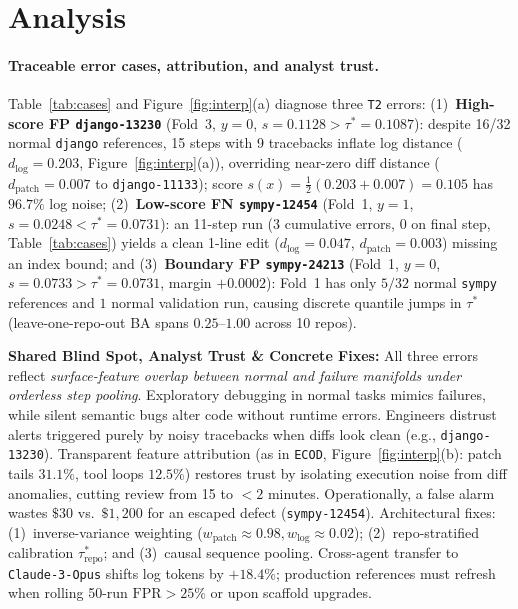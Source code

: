 \section{Analysis}\label{sec:analysis}
\paragraph{Traceable error cases, attribution, and analyst trust.}
Table~\ref{tab:cases} and Figure~\ref{fig:interp}(a) diagnose three \texttt{T2} errors: (1)~\textbf{High-score FP \texttt{django-13230}} (Fold~3, $y=0$, $s=0.1128>\tau^*=0.1087$): despite 16/32 normal \texttt{django} references, 15 steps with 9 tracebacks inflate log distance ($d_{\text{log}}=0.203$, Figure~\ref{fig:interp}(a)), overriding near-zero diff distance ($d_{\text{patch}}=0.007$ to \texttt{django-11133}); score $s(x)=\frac{1}{2}(0.203+0.007)=0.105$ has $\mathbf{96.7\%}$ log noise; (2)~\textbf{Low-score FN \texttt{sympy-12454}} (Fold~1, $y=1$, $s=0.0248<\tau^*=0.0731$): an 11-step run ($3$ cumulative errors, 0 on final step, Table~\ref{tab:cases}) yields a clean 1-line edit ($d_{\text{log}}=0.047$, $d_{\text{patch}}=0.003$) missing an index bound; and (3)~\textbf{Boundary FP \texttt{sympy-24213}} (Fold~1, $y=0$, $s=0.0733>\tau^*=0.0731$, margin $+0.0002$): Fold~1 has only $5/32$ normal \texttt{sympy} references and $1$ normal validation run, causing discrete quantile jumps in $\tau^*$ (leave-one-repo-out BA spans $0.25$--$1.00$ across 10 repos).

\textbf{Shared Blind Spot, Analyst Trust \& Concrete Fixes:} All three errors reflect \emph{surface-feature overlap between normal and failure manifolds under orderless step pooling}. Exploratory debugging in normal tasks mimics failures, while silent semantic bugs alter code without runtime errors. Engineers distrust alerts triggered purely by noisy tracebacks when diffs look clean (e.g., \texttt{django-13230}). Transparent feature attribution (as in \texttt{ECOD}, Figure~\ref{fig:interp}(b): patch tails $31.1\%$, tool loops $12.5\%$) restores trust by isolating execution noise from diff anomalies, cutting review from 15 to $<2$ minutes. Operationally, a false alarm wastes $\$30$ vs.\ $\$1{,}200$ for an escaped defect (\texttt{sympy-12454}). Architectural fixes: (1)~inverse-variance weighting ($w_{\text{patch}}\approx 0.98, w_{\text{log}}\approx 0.02$); (2)~repo-stratified calibration $\tau_{\text{repo}}^*$; and (3)~causal sequence pooling. Cross-agent transfer to \texttt{Claude-3-Opus} shifts log tokens by $+18.4\%$; production references must refresh when rolling 50-run $\mathrm{FPR}>25\%$ or upon scaffold upgrades.

